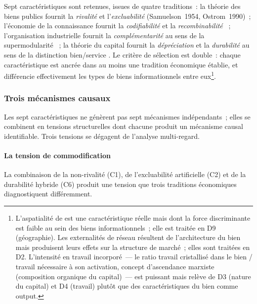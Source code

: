 Sept caractéristiques sont retenues, issues de quatre traditions~: la théorie des biens publics fournit la \emph{rivalité} et l'\emph{excluabilité} (Samuelson~1954, Ostrom~1990)~; l'économie de la connaissance fournit la \emph{codifiabilité} \parencite{cowan_explicit_2000} et la \emph{recombinabilité} \parencite{weitzman_recombinant_1998,quah_digital_2003}~; l'organisation industrielle fournit la \emph{complémentarité} au sens de la supermodularité \parencite{milgrom_economics_1990}~; la théorie du capital fournit la \emph{dépréciation} \parencite{haskel_capitalism_2018} et la \emph{durabilité} au sens de la distinction bien/service \parencite{hill_goods_1977}. Le critère de sélection est double~: chaque caractéristique est ancrée dans au moins une tradition économique établie, et différencie effectivement les types de biens informationnels entre eux\footnote{L'aspatialité de \textcite{quah_digital_2003} est une caractéristique réelle mais dont la force discriminante est faible au sein des biens informationnels~; elle est traitée en D9 (géographie). Les externalités de réseau \parencite{katz_network_1985} résultent de l'architecture du bien mais produisent leurs effets sur la structure de marché~; elles sont traitées en D2. L'intensité en travail incorporé~--- le ratio travail cristallisé dans le bien / travail nécessaire à son activation, concept d'ascendance marxiste (composition organique du capital)~--- est puissant mais relève de D3 (nature du capital) et D4 (travail) plutôt que des caractéristiques du bien comme output.}.


\subsubsection{Trois mécanismes causaux}

Les sept caractéristiques ne génèrent pas sept mécanismes indépendants~; elles se combinent en tensions structurelles dont chacune produit un mécanisme causal identifiable. Trois tensions se dégagent de l'analyse multi-regard.

\paragraph{La tension de commodification}

\markNEO \markMARX \markINST
La combinaison de la non-rivalité (C1), de l'excluabilité artificielle (C2) et de la durabilité hybride (C6) produit une tension que trois traditions économiques diagnostiquent différemment.

